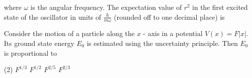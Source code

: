 \begin{enumerate}
\begin{minipage}{\textwidth}
$$	$$
	where $\omega$ is the angular frequency. The expectation value of $r^{2}$ in the first excited state of the oscillator in units of $\frac{\hbar}{m \omega}$ (rounded off to one decimal place) is
\end{minipage}
	\begin{minipage}{\textwidth}
	\item Consider the motion of a particle along the $x$ - axis in a potential $V(x)=F|x|$. Its ground state energy $E_{0}$ is estimated using the uncertainty principle. Then $E_{0}$ is proportional to
\end{minipage}
\begin{tasks}(2)
	\task[\textbf{A.}] $F^{1 / 3}$
	\task[\textbf{B.}] $F^{1 / 2}$
	\task[\textbf{C.}]$F^{2 / 5}$
	\task[\textbf{D.}]$F^{2 / 3}$
\end{tasks}
\end{enumerate}

